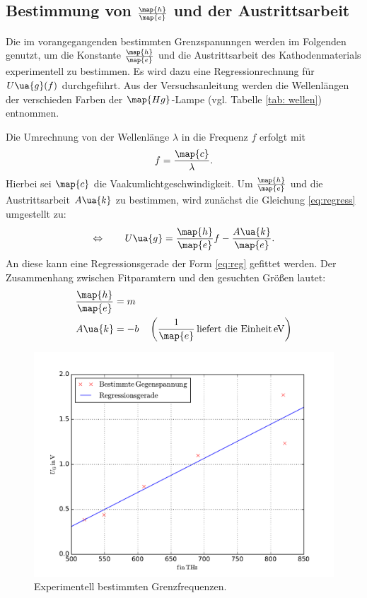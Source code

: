 \subsection{Bestimmung von $\frac{\map{h}}{\map{e}}$ und der Austrittsarbeit}

Die im vorangegangenden bestimmten Grenzspanunngen werden im %
Folgenden genutzt, um die Konstante $\frac{\map{h}}{\map{e}}$ und die Austrittsarbeit des Kathodenmaterials
experimentell zu bestimmen.
Es wird dazu eine Regressionrechnung für $U\ua{g}(f)$ durchgeführt.
Aus der Versuchsanleitung\cite{anleitung500} werden die Wellenlängen der verschieden Farben der $\map{Hg}$-Lampe (vgl. Tabelle \ref{tab: wellen})
entnommen.

Die Umrechnung von der Wellenlänge $\lambda$ in die Frequenz $f$ erfolgt mit
\begin{equation*}
  \label{eq:umrech}
  f=\frac{\map{c}}{\lambda}.
\end{equation*}
Hierbei sei $\map{c}$ die Vaakumlichtgeschwindigkeit\cite{scipy}. %
Um $\frac{\map{h}}{\map{e}}$ und die Austrittsarbeit $A\ua{k}$ zu bestimmen, wird zunächst die
Gleichung \eqref{eq:regress} umgestellt zu:
\begin{equation*}
  \Leftrightarrow \qquad U\ua{g}=\frac{\map{h}}{\map{e}} f - \frac{A\ua{k}}{\map{e}}.
\end{equation*}
An diese kann eine Regressionsgerade der Form \eqref{eq:reg} gefittet werden.
Der Zusammenhang zwischen Fitparamtern und den gesuchten Größen lautet:
\begin{align*}
  \frac{\map{h}}{\map{e}}&=m\\
  A\ua{k}&=-b \quad \left(\frac{1}{\map{e}}\,\text{liefert die Einheit} \, \si{\eV}\right)
\end{align*}
\begin{figure}
    \centering
    \includegraphics[width=1 \textwidth]{../Messdaten/wellenlaenge_gegen.pdf}
    \caption{Experimentell bestimmten Grenzfrequenzen.}
    \label{fig:grenz}
  \end{figure}
